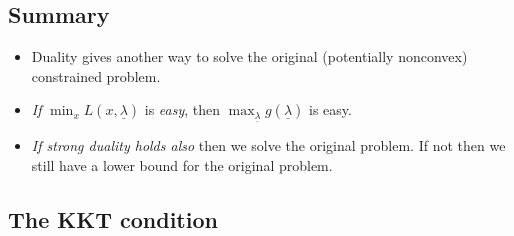 \subsection{Summary}
\begin{itemize}
    \item Duality gives another way to solve the original (potentially nonconvex) constrained problem.
    \item \emph{If} $\min_x L(x,\underline{\lambda})$ is \emph{easy}, then $\max_{\underline{\lambda}} g(\underline{\lambda})$ is easy.
    \item \emph{If strong duality holds also} then we solve the original problem. If not then we still have a lower bound for the original problem. 
\end{itemize}
\subsection{The KKT condition}
